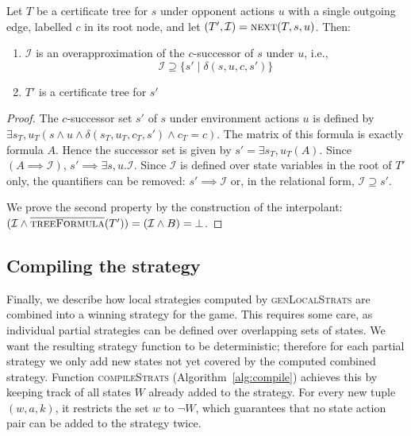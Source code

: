 \begin{proposition}\label{prop:next}
    Let $T$ be a certificate tree for $s$ under opponent actions $u$ with a single outgoing edge, labelled $c$ in its root node, and let $(T',\mathcal{I})
    = \textsc{next}(T,s,u)$.
    Then:
    \begin{enumerate}
        \item $\mathcal{I}$ is an overapproximation of the $c$-successor of $s$ under $u$, i.e., $$\mathcal{I} \supseteq \{ s' \mid \delta(s, u, c, s') \}$$
        \item $T'$ is a certificate tree for $s'$
    \end{enumerate}
\end{proposition}
\begin{proof}
    The $c$-successor set $s'$ of $s$ under environment actions $u$ is defined by $\exists s_T, u_T (s \land u \land \delta(s_T, u_T, c_T, s') \land c_T = c)$. The matrix of this formula is exactly formula $A$.  Hence the successor set is given by $s' = \exists s_T,u_T (A)$.  Since $(A \implies \mathcal{I})$, $s' \implies \exists s,u.  \mathcal{I}$.  Since $\mathcal{I}$ is defined over state variables in the root of $T'$ only, the quantifiers can be removed: $s' \implies \mathcal{I}$ or, in the relational form, $\mathcal{I} \supseteq s'$.
    
    We prove the second property by the construction of the interpolant: $(\mathcal{I} \land \textsc{$\overline{\mbox{treeFormula}}$}(T')) = (\mathcal{I} \land B) = \bot$.
\end{proof}

\subsection{Compiling the strategy}

Finally, we describe how local strategies computed by \textsc{genLocalStrats} are combined into a winning strategy for the game.  This requires some care, as individual partial strategies can be defined over overlapping sets of states.  We want the resulting strategy function to be deterministic; therefore for each partial strategy we only add new states not yet covered by the computed combined strategy.  Function \textsc{compileStrats} (Algorithm~\ref{alg:compile}) achieves this by keeping track of all states $W$ already added to the strategy.  For every new tuple $(w, a, k)$, it restricts the set $w$ to $\neg W$, which guarantees that no state action pair can be added to the strategy twice.  


